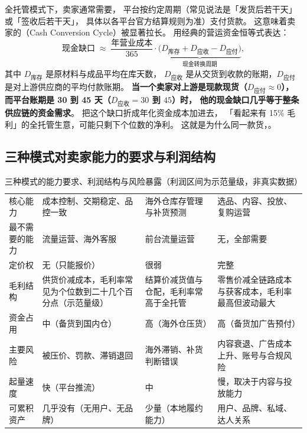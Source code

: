 \begin{keypoint}[账期才是全托管最容易忽视的成本项]
全托管模式下，卖家通常需要，
平台按约定周期（常见说法是「发货后若干天」或「签收后若干天」，
具体以各平台官方结算规则为准）支付货款。
这意味着卖家的（Cash Conversion Cycle）被显著拉长。
用经典的营运资金恒等式表达：
\begin{equation}
\text{现金缺口} \;\approx\; \frac{\text{年营业成本}}{365}
\cdot \underbrace{\big( D_{\text{库存}} + D_{\text{应收}} - D_{\text{应付}} \big)}_{\text{现金转换周期}},
\label{eq:fm-cashgap}
\end{equation}
其中 $D_{\text{库存}}$ 是原材料与成品平均在库天数，
$D_{\text{应收}}$ 是从交货到收款的账期，$D_{\text{应付}}$ 是对上游供应商的平均付款账期。
\textbf{当一个卖家对上游是现款现货（$D_{\text{应付}} \approx 0$），
而平台账期是 30 到 45 天（$D_{\text{应收}} = 30$ 到 $45$）时，
他的现金缺口几乎等于整条供应链的资金需求}。
把这个缺口折成年化资金成本加进去，
「看起来有 15\% 毛利」的全托管生意，可能只剩下个位数的净利。
这就是为什么同一款货，。
\end{keypoint}

\subsection{三种模式对卖家能力的要求与利润结构}

\begin{table}[htbp]
\centering
\caption{三种模式的能力要求、利润结构与风险暴露（利润区间为示范量级，非真实数据）}
\label{tab:plat-capability}
\small
\begin{tabularx}{\textwidth}{L{2.0cm} L{3.4cm} L{3.4cm} Y}
\toprule
{} &  &  &  \\
\midrule
核心能力 & 成本控制、交期稳定、品控一致 & 海外仓库存管理与补货预测 & 选品、内容、投放、复购运营 \\
\addlinespace
最不需要的能力 & 流量运营、海外客服 & 前台流量运营 & 无，全部需要 \\
\addlinespace
定价权 & 无（只能报价） & 很弱 & 完整 \\
\addlinespace
毛利结构 & 供货价减成本，毛利率常见为个位数到二十几个百分点（示范量级） & 结算价减货值与仓配，毛利率常高于全托管 & 零售价减全链路成本与获客成本，毛利率最高但波动最大 \\
\addlinespace
资金占用 & 中（备货到国内仓） & 高（海外仓压货） & 高（备货加广告预付） \\
\addlinespace
主要风险 & 被压价、罚款、滞销退回 & 海外滞销、补货判断错误 & 内容衰退、广告成本上升、账号与合规风险 \\
\addlinespace
起量速度 & 快（平台推流） & 中 & 慢，取决于内容与投放能力 \\
\addlinespace
可累积资产 & 几乎没有（无用户、无品牌） & 少量（本地履约能力） & 用户、品牌、私域、达人关系 \\
\bottomrule
\end{tabularx}
\end{table}

